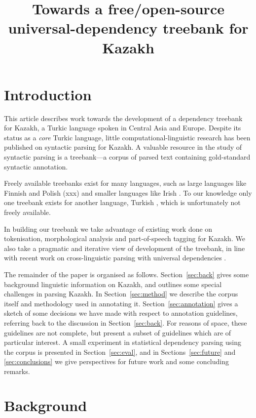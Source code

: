\documentclass[a4paper,11pt, onecolumn,twoside]{article}
\title{Towards a free/open-source universal-dependency treebank for Kazakh}
\begin{document}
\maketitleabstract{}
\thispagestyle{firststyle}

\section{Introduction}

This article describes work towards the development of a dependency treebank for Kazakh, a Turkic language spoken in Central Asia and Europe.
Despite its status as a \emph{core} Turkic
language, little computational-linguistic research has been published on syntactic
parsing for Kazakh.
A valuable resource in the study of syntactic parsing is
a treebank---a corpus of parsed text containing gold-standard syntactic annotation.

Freely available treebanks exist for many languages, such as large languages like Finnish \parencite{haverinen2013tdt,voutilainen11} 
and Polish (xxx) and smaller languages like Irish \parencite{Lynn12}. To our knowledge only one treebank
exists for another language, Turkish \parencite{Oflazer03}, which is unfortunately not freely available.

In building our treebank we take advantage of existing work done on tokenisation,
morphological analysis and part-of-speech tagging for Kazakh. We also take a pragmatic
and iterative view of development of the treebank, in line with recent work 
on cross-linguistic parsing with universal dependencies \parencite{DeMarneffe14}.

The remainder of the paper is organised as follows. Section~\ref{sec:back} gives some
background linguistic information on Kazakh, and outlines some special challenges in
parsing Kazakh. In Section~\ref{sec:method} we describe the corpus itself and methodology
used in annotating it. Section~\ref{sec:annotation} gives a sketch of some decisions
we have made with respect to annotation guidelines, referring back to the discussion in
Section~\ref{sec:back}. For reasons of space, these guidelines are not complete, but
present a subset of guidelines which are of particular interest. A small experiment
in statistical dependency parsing using the corpus is presented in Section~\ref{sec:eval},
and in Sections~\ref{sec:future} and \ref{sec:conclusions} we give perspectives
for future work and some concluding remarks.


\section{Background}
\end{document}
